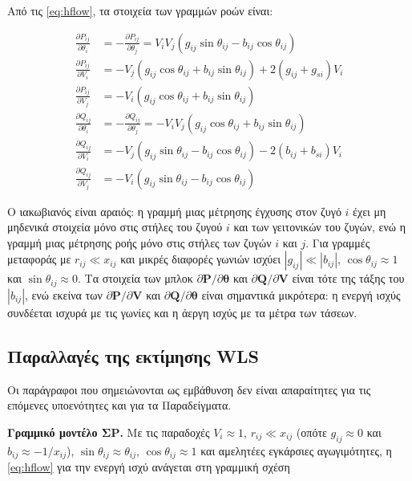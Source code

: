 Από τις \eqref{eq:hflow}, τα στοιχεία των γραμμών ροών είναι:

\begin{align}
\frac{\partial P_{ij}}{\partial \theta_i} &= -\frac{\partial P_{ij}}{\partial \theta_j}
  = V_i V_j \left( g_{ij}\sin\theta_{ij} - b_{ij}\cos\theta_{ij} \right) \\
\frac{\partial P_{ij}}{\partial V_i} &= -V_j \left( g_{ij}\cos\theta_{ij} + b_{ij}\sin\theta_{ij} \right) + 2\left( g_{ij} + g_{si} \right) V_i \\
\frac{\partial P_{ij}}{\partial V_j} &= -V_i \left( g_{ij}\cos\theta_{ij} + b_{ij}\sin\theta_{ij} \right) \\
\frac{\partial Q_{ij}}{\partial \theta_i} &= -\frac{\partial Q_{ij}}{\partial \theta_j}
  = -V_i V_j \left( g_{ij}\cos\theta_{ij} + b_{ij}\sin\theta_{ij} \right) \\
\frac{\partial Q_{ij}}{\partial V_i} &= -V_j \left( g_{ij}\sin\theta_{ij} - b_{ij}\cos\theta_{ij} \right) - 2\left( b_{ij} + b_{si} \right) V_i \\
\frac{\partial Q_{ij}}{\partial V_j} &= -V_i \left( g_{ij}\sin\theta_{ij} - b_{ij}\cos\theta_{ij} \right)
\label{eq:jacflow}
\end{align}

Ο ιακωβιανός είναι αραιός: η γραμμή μιας μέτρησης έγχυσης στον ζυγό $i$ έχει μη μηδενικά
στοιχεία μόνο στις στήλες του ζυγού $i$ και των γειτονικών του ζυγών, ενώ η γραμμή μιας
μέτρησης ροής μόνο στις στήλες των ζυγών $i$ και $j$. Για γραμμές μεταφοράς με
$r_{ij} \ll x_{ij}$ και μικρές διαφορές γωνιών ισχύει $|g_{ij}| \ll |b_{ij}|$,
$\cos\theta_{ij} \approx 1$ και $\sin\theta_{ij} \approx 0$. Τα στοιχεία των μπλοκ
$\partial\mathbf{P}/\partial\boldsymbol{\theta}$ και $\partial\mathbf{Q}/\partial\mathbf{V}$
είναι τότε της τάξης του $|b_{ij}|$, ενώ εκείνα των $\partial\mathbf{P}/\partial\mathbf{V}$ και
$\partial\mathbf{Q}/\partial\boldsymbol{\theta}$ είναι σημαντικά μικρότερα: η ενεργή ισχύς
συνδέεται ισχυρά με τις γωνίες και η άεργη ισχύς με τα μέτρα των τάσεων.

\subsection{Παραλλαγές της εκτίμησης WLS}

Οι παράγραφοι που σημειώνονται ως εμβάθυνση δεν είναι απαραίτητες για τις επόμενες
υποενότητες και για τα Παραδείγματα.

\textbf{Γραμμικό μοντέλο ΣΡ.} Με τις παραδοχές $V_i \approx 1$, $r_{ij} \ll x_{ij}$ (οπότε
$g_{ij} \approx 0$ και $b_{ij} \approx -1/x_{ij}$), $\sin\theta_{ij} \approx \theta_{ij}$,
$\cos\theta_{ij} \approx 1$ και αμελητέες εγκάρσιες αγωγιμότητες, η \eqref{eq:hflow} για την
ενεργή ισχύ ανάγεται στη γραμμική σχέση

